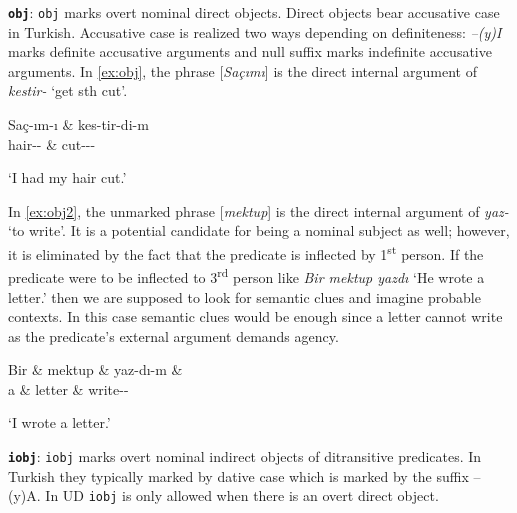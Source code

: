 \documentclass[11pt,a4paper]{article}
\begin{document}
\textbf{\texttt{obj}}: \texttt{obj} marks overt nominal direct objects. Direct objects bear accusative case in Turkish. Accusative case is realized two ways depending on definiteness: \textit{–(y)I} marks definite accusative arguments and null suffix marks indefinite accusative arguments. In \autoref{ex:obj}, the phrase [\textit{Saçımı}] is the direct internal argument of \textit{kestir-} `get sth cut'.

\begin{exe}
\ex \label{ex:obj}
\begin{dependency}
\begin{deptext}
Saç-ım-ı \& kes-tir-di-m \\ hair-\Poss{}-\Acc{} \& cut-\Caus{}-\Pst{}-\Fsg{} \\
\end{deptext}
\end{dependency}
\glt `I had my hair cut.'
\end{exe}

In \autoref{ex:obj2}, the unmarked phrase [\textit{mektup}] is the direct internal argument of \textit{yaz-} `to write'. It is a potential candidate for being a nominal subject as well; however, it is eliminated by the fact that the predicate is inflected by 1\textsuperscript{st} person. If the predicate were to be inflected to 3\textsuperscript{rd} person like \textit{Bir mektup yazdı} ‘He wrote a letter.’ then we are supposed to look for semantic clues and imagine probable contexts. In this case semantic clues would be enough since a letter cannot write as the predicate’s external argument demands agency.

\begin{exe}
\ex \label{ex:obj2}
\begin{dependency}
\begin{deptext}
Bir \& mektup \& yaz-dı-m \& \\ a \& letter \& write-\Pst{}-{\Fsg} \\
\end{deptext}
\end{dependency}
\glt `I wrote a letter.'
\end{exe}

\textbf{\texttt{iobj}}:
\texttt{iobj} marks overt nominal indirect objects of ditransitive predicates. In Turkish they typically marked by dative case which is marked by the suffix –(y)A. In UD \texttt{iobj} is only allowed when there is an overt direct object.
\end{document}
